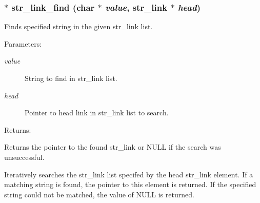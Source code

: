 \subsubsection{$\ast$ str\_\-link\_\-find (char $\ast$ {\em value}, {\bf str\_\-link} $\ast$ {\em head})}\label{link_8c_a11}


Finds specified string in the given str\_\-link list.

\begin{Desc}
\item[Parameters: ]\par
\begin{description}
\item[{\em 
value}]String to find in str\_\-link list. \item[{\em 
head}]Pointer to head link in str\_\-link list to search. \end{description}
\end{Desc}
\begin{Desc}
\item[Returns: ]\par
Returns the pointer to the found str\_\-link or NULL if the search was unsuccessful.\end{Desc}
Iteratively searches the str\_\-link list specifed by the head str\_\-link element. If a matching string is found, the pointer to this element is returned. If the specified string could not be matched, the value of NULL is returned. 